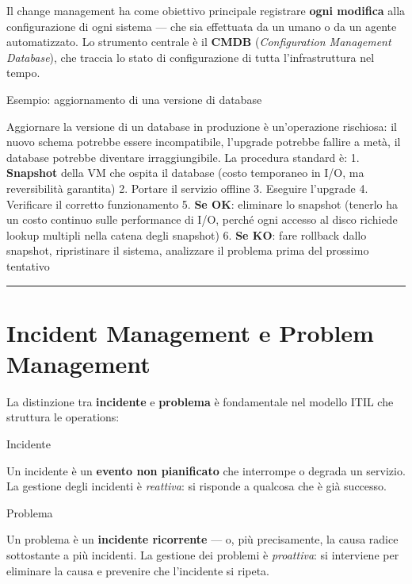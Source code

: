\documentclass[
  italian,
  openany]{book}
\begin{document}
Il change management ha come obiettivo principale registrare
\textbf{ogni modifica} alla configurazione di ogni sistema --- che sia
effettuata da un umano o da un agente automatizzato. Lo strumento
centrale è il \textbf{CMDB} (\emph{Configuration Management Database}),
che traccia lo stato di configurazione di tutta l'infrastruttura nel
tempo.

\begin{callouttip}{Esempio: aggiornamento di una versione di database}

Aggiornare la versione di un database in produzione è un'operazione
rischiosa: il nuovo schema potrebbe essere incompatibile, l'upgrade
potrebbe fallire a metà, il database potrebbe diventare irraggiungibile.
La procedura standard è: 1. \textbf{Snapshot} della VM che ospita il
database (costo temporaneo in I/O, ma reversibilità garantita) 2.
Portare il servizio offline 3. Eseguire l'upgrade 4. Verificare il
corretto funzionamento 5. \textbf{Se OK}: eliminare lo snapshot (tenerlo
ha un costo continuo sulle performance di I/O, perché ogni accesso al
disco richiede lookup multipli nella catena degli snapshot) 6.
\textbf{Se KO}: fare rollback dallo snapshot, ripristinare il sistema,
analizzare il problema prima del prossimo tentativo

\end{callouttip}

\begin{center}\rule{0.5\linewidth}{0.5pt}\end{center}

\section{Incident Management e Problem
Management}\label{incident-management-e-problem-management}

La distinzione tra \textbf{incidente} e \textbf{problema} è fondamentale
nel modello ITIL che struttura le operations:

\begin{calloutdefinition}{Incidente}

Un incidente è un \textbf{evento non pianificato} che interrompe o
degrada un servizio. La gestione degli incidenti è \emph{reattiva}: si
risponde a qualcosa che è già successo.

\end{calloutdefinition}

\begin{calloutdefinition}{Problema}

Un problema è un \textbf{incidente ricorrente} --- o, più precisamente,
la causa radice sottostante a più incidenti. La gestione dei problemi è
\emph{proattiva}: si interviene per eliminare la causa e prevenire che
l'incidente si ripeta.

\end{calloutdefinition}
\end{document}
